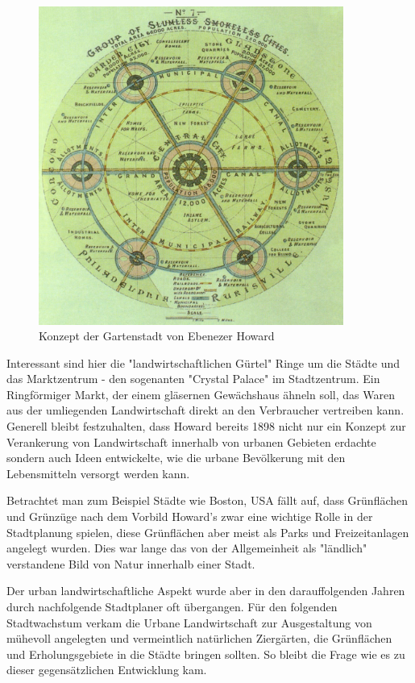 \documentclass{scrartcl}
\begin{document}
\begin{figure}[ht]
\centering
\includegraphics[width=10cm]{image_folder/GardenCityConcept_EbenezerHoward.jpg}
\caption{Konzept der Gartenstadt von Ebenezer Howard}
\label{fig:GardenCityConcept_EbenezerHoward}
\end{figure}

Interessant sind hier die "landwirtschaftlichen Gürtel" Ringe um die Städte und das Marktzentrum - den sogenanten "Crystal Palace" im Stadtzentrum.
Ein Ringförmiger Markt, der einem gläsernen Gewächshaus ähneln soll, das Waren aus der umliegenden Landwirtschaft direkt an den Verbraucher vertreiben kann. Generell bleibt festzuhalten, dass Howard bereits 1898 nicht nur ein Konzept zur Verankerung von Landwirtschaft innerhalb von urbanen Gebieten erdachte sondern auch Ideen entwickelte, wie die urbane Bevölkerung mit den Lebensmitteln versorgt werden kann.

Betrachtet man zum Beispiel Städte wie Boston, USA fällt auf, dass Grünflächen und Grünzüge nach dem Vorbild Howard's zwar eine wichtige Rolle in der Stadtplanung spielen, diese Grünflächen aber meist als Parks und Freizeitanlagen angelegt wurden. Dies war lange das von der Allgemeinheit als "ländlich" verstandene Bild von Natur innerhalb einer Stadt.

Der urban landwirtschaftliche Aspekt wurde aber in den darauffolgenden Jahren durch nachfolgende Stadtplaner oft übergangen. Für den folgenden Stadtwachstum verkam die Urbane Landwirtschaft zur Ausgestaltung von mühevoll angelegten und vermeintlich natürlichen Ziergärten, die Grünflächen und Erholungsgebiete in die Städte bringen sollten. So bleibt die Frage wie es zu dieser gegensätzlichen Entwicklung kam.
\end{document}
